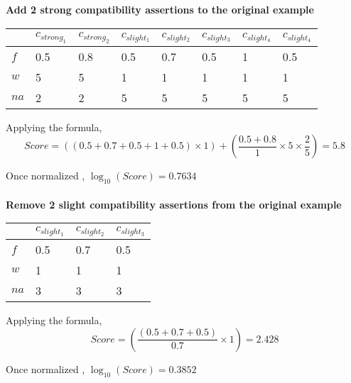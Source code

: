 \documentclass[11pt]{article}
\begin{document}
\begin{large}
\textbf{Add 2 strong compatibility assertions to the original example} \\
\begin{tabular}{|l|l|l|l|l|l|l|l|}
\hline
     & $c_{strong_{1}}$ & $c_{strong_{2}}$ & $c_{slight_{1}}$ & $c_{slight_{2}}$ & $c_{slight_{3}}$ & $c_{slight_{4}}$ & $c_{slight_{4}}$ \\ \hline
$f$  & 0.5              & 0.8              & 0.5              & 0.7              & 0.5              & 1                & 0.5              \\ \hline
$w$  & 5                & 5                & 1                & 1                & 1                & 1                & 1                \\ \hline
$na$ & 2                & 2                & 5                & 5                & 5                & 5                & 5                \\ \hline
\end{tabular}

Applying the formula, \\
$$Score = ((0.5 + 0.7 +0.5 +1 + 0.5) \times 1) + (\frac{0.5+0.8}{1} \times 5 \times \frac{2}{5}) = 5.8 $$

Once normalized , $\log_{10}(Score) =  0.7634$ \\ \\

\textbf{Remove 2 slight compatibility assertions from the original example} \\
\begin{tabular}{|l|l|l|l|}
\hline
     & $c_{slight_{1}}$ & $c_{slight_{2}}$ & $c_{slight_{3}}$ \\ \hline
$f$  & 0.5              & 0.7              & 0.5              \\ \hline
$w$  & 1                & 1                & 1                \\ \hline
$na$ & 3                & 3                & 3                \\ \hline
\end{tabular}

Applying the formula, \\
$$Score = (\frac{(0.5 + 0.7 +0.5)}{0.7} \times 1) = 2.428 $$

Once normalized , $\log_{10}(Score) =  0.3852$ \\ \\


\end{large}
\end{document}

